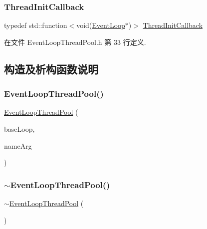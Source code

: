 \subsubsection{\texorpdfstring{Thread\+Init\+Callback}{ThreadInitCallback}}
{\footnotesize\ttfamily typedef std\+::function$<$void(\hyperlink{classmuduo_1_1net_1_1EventLoop}{Event\+Loop}$\ast$)$>$ \hyperlink{classmuduo_1_1net_1_1EventLoopThreadPool_a4665880f4633f1e7d95fd6fef6811717}{Thread\+Init\+Callback}}



在文件 Event\+Loop\+Thread\+Pool.\+h 第 33 行定义.



\subsection{构造及析构函数说明}
\mbox{\label{classmuduo_1_1net_1_1EventLoopThreadPool_a2961d8892bd97371bfb49a0da492c97a}} 
\subsubsection{\texorpdfstring{Event\+Loop\+Thread\+Pool()}{EventLoopThreadPool()}}
{\footnotesize\ttfamily \hyperlink{classmuduo_1_1net_1_1EventLoopThreadPool}{Event\+Loop\+Thread\+Pool} (\begin{DoxyParamCaption}\item[{\hyperlink{classmuduo_1_1net_1_1EventLoop}{Event\+Loop} $\ast$}]{base\+Loop,  }\item[{const string \&}]{name\+Arg }\end{DoxyParamCaption})}

\mbox{\label{classmuduo_1_1net_1_1EventLoopThreadPool_a009ff3f40b47ffa7ff8ed249e4be9864}} 
\subsubsection{\texorpdfstring{$\sim$\+Event\+Loop\+Thread\+Pool()}{~EventLoopThreadPool()}}
{\footnotesize\ttfamily $\sim$\hyperlink{classmuduo_1_1net_1_1EventLoopThreadPool}{Event\+Loop\+Thread\+Pool} (\begin{DoxyParamCaption}{ }\end{DoxyParamCaption})}



